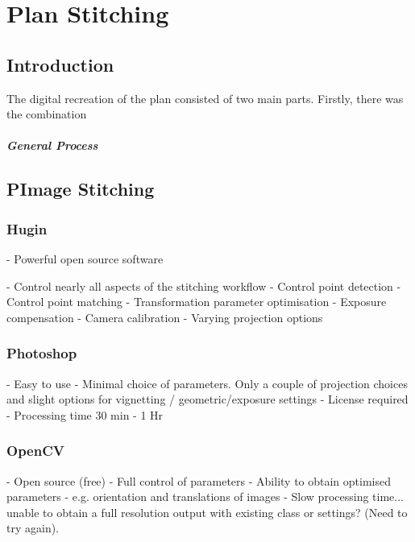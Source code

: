 
\chapter{Plan Stitching}
\label{chp:MosaicStitchingChapter}

\section{Introduction}
The digital recreation of the plan consisted of two main parts. Firstly, there was the combination

	\paragraph{General Process}

\section{PImage Stitching}

	\subsection{Hugin}
	- Powerful open source software
	
	- Control nearly all aspects of the stitching workflow
		- Control point detection
		- Control point matching
		- Transformation parameter optimisation
		- Exposure compensation
		- Camera calibration
		- Varying projection options

	\subsection{Photoshop}
	- Easy to use
	- Minimal choice of parameters. Only a couple of projection choices and slight options for vignetting / geometric/exposure settings
	- License required
	- Processing time 30 min - 1 Hr

	\subsection{OpenCV}
	- Open source (free)
	- Full control of parameters
	- Ability to obtain optimised parameters - e.g. orientation and translations of images
	- Slow processing time... unable to obtain a full resolution output with existing class or settings?
	(Need to try again).

